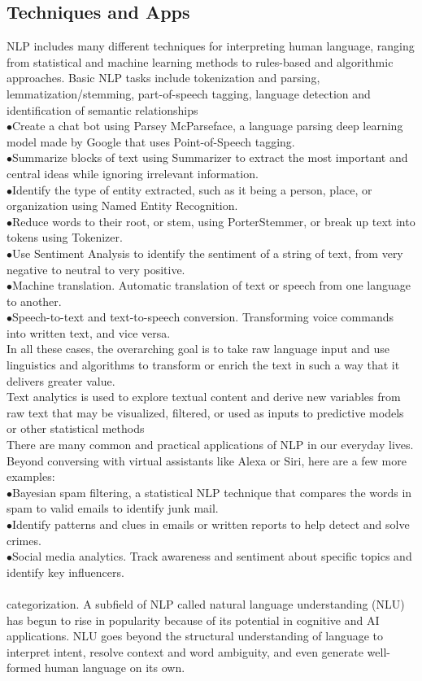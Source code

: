 \subsection{Techniques and Apps}
NLP includes many different techniques for interpreting human language, ranging from statistical and machine learning methods to rules-based and algorithmic approaches.
Basic NLP tasks include tokenization and parsing, lemmatization/stemming, part-of-speech tagging, language detection and identification of semantic relationships\\
\indent$\bullet$Create a chat bot using Parsey McParseface, a language parsing deep learning model made by Google that uses Point-of-Speech tagging.\\
\indent$\bullet$Summarize blocks of text using Summarizer to extract the most important and central ideas while ignoring irrelevant information.\\
\indent$\bullet$Identify the type of entity extracted, such as it being a person, place, or organization using Named Entity Recognition.\\
\indent$\bullet$Reduce words to their root, or stem, using PorterStemmer, or break up text into tokens using Tokenizer.\\
\indent$\bullet$Use Sentiment Analysis to identify the sentiment of a string of text, from very negative to neutral to very positive.\\
\indent$\bullet$Machine translation. Automatic translation of text or speech from one language to another.\\
\indent$\bullet$Speech-to-text and text-to-speech conversion. Transforming voice commands into written text, and vice versa.\\
In all these cases, the overarching goal is to take raw language input and use linguistics and algorithms to transform or enrich the text in such a way that it delivers greater value.\\
Text analytics is used to explore textual content and derive new variables from raw text that may be visualized, filtered, or used as inputs to predictive models or other statistical methods\\
There are many common and practical applications of NLP in our everyday lives. Beyond conversing with virtual assistants like Alexa or Siri, here are a few more examples:\\
\indent$\bullet$Bayesian spam filtering, a statistical NLP technique that compares the words in spam to valid emails to identify junk mail.\\
\indent$\bullet$Identify patterns and clues in emails or written reports to help detect and solve crimes.\\
\indent$\bullet$Social media analytics. Track awareness and sentiment about specific topics and identify key influencers.\\\\
categorization.
A subfield of NLP called natural language understanding (NLU) has begun to rise in popularity because of its potential in cognitive and AI applications. NLU goes beyond the structural understanding of language to interpret intent, resolve context and word ambiguity, and even generate well-formed human language on its own. 
